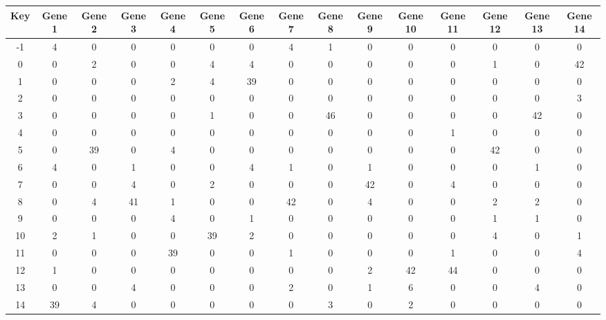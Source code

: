 \begin{tabular}{|c|c|c|c|c|c|c|c|c|c|c|c|c|c|c|}
\hline
Key & Gene 1 & Gene 2 & Gene 3 & Gene 4 & Gene 5 & Gene 6 & Gene 7 & Gene 8 & Gene 9 & Gene 10 & Gene 11 & Gene 12 & Gene 13 & Gene 14 \\
\hline
-1 & 4 & 0 & 0 & 0 & 0 & 0 & 4 & 1 & 0 & 0 & 0 & 0 & 0 & 0 \\
0 & 0 & 2 & 0 & 0 & 4 & 4 & 0 & 0 & 0 & 0 & 0 & 1 & 0 & 42 \\
1 & 0 & 0 & 0 & 2 & 4 & 39 & 0 & 0 & 0 & 0 & 0 & 0 & 0 & 0 \\
2 & 0 & 0 & 0 & 0 & 0 & 0 & 0 & 0 & 0 & 0 & 0 & 0 & 0 & 3 \\
3 & 0 & 0 & 0 & 0 & 1 & 0 & 0 & 46 & 0 & 0 & 0 & 0 & 42 & 0 \\
4 & 0 & 0 & 0 & 0 & 0 & 0 & 0 & 0 & 0 & 0 & 1 & 0 & 0 & 0 \\
5 & 0 & 39 & 0 & 4 & 0 & 0 & 0 & 0 & 0 & 0 & 0 & 42 & 0 & 0 \\
6 & 4 & 0 & 1 & 0 & 0 & 4 & 1 & 0 & 1 & 0 & 0 & 0 & 1 & 0 \\
7 & 0 & 0 & 4 & 0 & 2 & 0 & 0 & 0 & 42 & 0 & 4 & 0 & 0 & 0 \\
8 & 0 & 4 & 41 & 1 & 0 & 0 & 42 & 0 & 4 & 0 & 0 & 2 & 2 & 0 \\
9 & 0 & 0 & 0 & 4 & 0 & 1 & 0 & 0 & 0 & 0 & 0 & 1 & 1 & 0 \\
10 & 2 & 1 & 0 & 0 & 39 & 2 & 0 & 0 & 0 & 0 & 0 & 4 & 0 & 1 \\
11 & 0 & 0 & 0 & 39 & 0 & 0 & 1 & 0 & 0 & 0 & 1 & 0 & 0 & 4 \\
12 & 1 & 0 & 0 & 0 & 0 & 0 & 0 & 0 & 2 & 42 & 44 & 0 & 0 & 0 \\
13 & 0 & 0 & 4 & 0 & 0 & 0 & 2 & 0 & 1 & 6 & 0 & 0 & 4 & 0 \\
14 & 39 & 4 & 0 & 0 & 0 & 0 & 0 & 3 & 0 & 2 & 0 & 0 & 0 & 0 \\
\hline
\end{tabular}